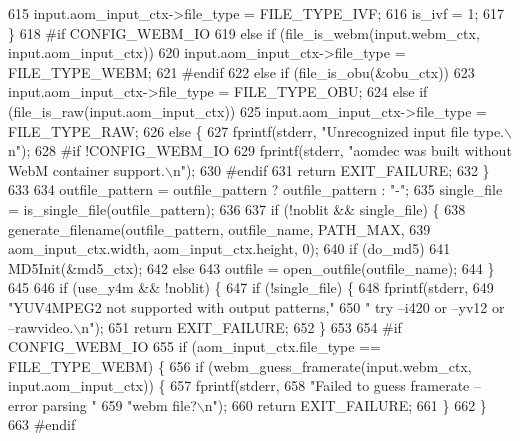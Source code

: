\begin{DoxyCodeInclude}
{{{{{{{{{{{{{{{{{{{{{{{{{{{{{{615     input.aom\_input\_ctx->file\_type = FILE\_TYPE\_IVF;
616     is\_ivf = 1;
617   \}
618 \textcolor{preprocessor}{#if CONFIG\_WEBM\_IO}
619   \textcolor{keywordflow}{else} \textcolor{keywordflow}{if} (file\_is\_webm(input.webm\_ctx, input.aom\_input\_ctx))
620     input.aom\_input\_ctx->file\_type = FILE\_TYPE\_WEBM;
621 \textcolor{preprocessor}{#endif}
622   \textcolor{keywordflow}{else} \textcolor{keywordflow}{if} (file\_is\_obu(&obu\_ctx))
623     input.aom\_input\_ctx->file\_type = FILE\_TYPE\_OBU;
624   \textcolor{keywordflow}{else} \textcolor{keywordflow}{if} (file\_is\_raw(input.aom\_input\_ctx))
625     input.aom\_input\_ctx->file\_type = FILE\_TYPE\_RAW;
626   \textcolor{keywordflow}{else} \{
627     fprintf(stderr, \textcolor{stringliteral}{"Unrecognized input file type.\(\backslash\)n"});
628 \textcolor{preprocessor}{#if !CONFIG\_WEBM\_IO}
629     fprintf(stderr, \textcolor{stringliteral}{"aomdec was built without WebM container support.\(\backslash\)n"});
630 \textcolor{preprocessor}{#endif}
631     \textcolor{keywordflow}{return} EXIT\_FAILURE;
632   \}
633 
634   outfile\_pattern = outfile\_pattern ? outfile\_pattern : \textcolor{stringliteral}{"-"};
635   single\_file = is\_single\_file(outfile\_pattern);
636 
637   \textcolor{keywordflow}{if} (!noblit && single\_file) \{
638     generate\_filename(outfile\_pattern, outfile\_name, PATH\_MAX,
639                       aom\_input\_ctx.width, aom\_input\_ctx.height, 0);
640     \textcolor{keywordflow}{if} (do\_md5)
641       MD5Init(&md5\_ctx);
642     \textcolor{keywordflow}{else}
643       outfile = open\_outfile(outfile\_name);
644   \}
645 
646   \textcolor{keywordflow}{if} (use\_y4m && !noblit) \{
647     \textcolor{keywordflow}{if} (!single\_file) \{
648       fprintf(stderr,
649               \textcolor{stringliteral}{"YUV4MPEG2 not supported with output patterns,"}
650               \textcolor{stringliteral}{" try --i420 or --yv12 or --rawvideo.\(\backslash\)n"});
651       \textcolor{keywordflow}{return} EXIT\_FAILURE;
652     \}
653 
654 \textcolor{preprocessor}{#if CONFIG\_WEBM\_IO}
655     \textcolor{keywordflow}{if} (aom\_input\_ctx.file\_type == FILE\_TYPE\_WEBM) \{
656       \textcolor{keywordflow}{if} (webm\_guess\_framerate(input.webm\_ctx, input.aom\_input\_ctx)) \{
657         fprintf(stderr,
658                 \textcolor{stringliteral}{"Failed to guess framerate -- error parsing "}
659                 \textcolor{stringliteral}{"webm file?\(\backslash\)n"});
660         \textcolor{keywordflow}{return} EXIT\_FAILURE;
661       \}
662     \}
663 \textcolor{preprocessor}{#endif}
}}}}}}}}}}}}}}}}}}}}}}}}}}}}}}
\end{DoxyCodeInclude}
